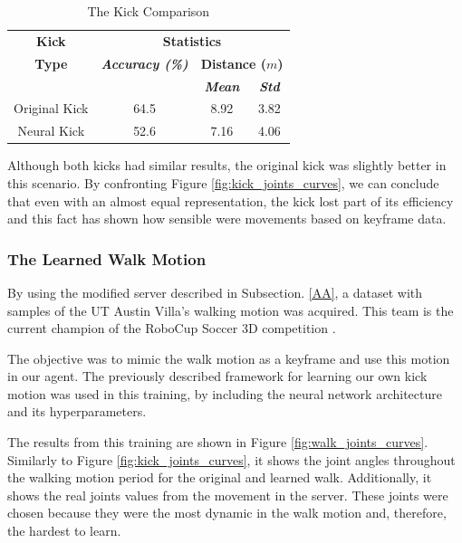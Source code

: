 \begin{table}[htbp]
	\caption{The Kick Comparison}
	\begin{center} 
		\begin{tabular}{|c|c|c|c|}
			\hline
			\textbf{Kick}&\multicolumn{3}{|c|}{\textbf{Statistics}} \\
			\cline{2-4} 
			\textbf{Type} & \textbf{\textit{Accuracy (\%)}}& \multicolumn{2}{|c|}{\textbf{Distance (\(m\))}} \\ 
			\cline {3-4}
			& & \textbf{\textit{Mean}}& \textbf{\textit{Std}} \\
			\hline
			Original Kick & 64.5 & 8.92 & 3.82  \\
			\hline
			Neural Kick & 52.6 & 7.16 & 4.06 \\
			\hline
		\end{tabular}
		\label{tab_kicks_statistics}
	\end{center}
\end{table}

Although both kicks had similar results, the original kick was slightly better in this scenario. By confronting Figure \ref{fig:kick_joints_curves}, we can conclude that even with an almost equal representation, the kick lost part of its efficiency and this fact has shown how sensible were movements based on keyframe data.

\subsubsection{The Learned Walk Motion}
By using the modified server described in Subsection. \ref{AA}, a dataset with samples of the UT Austin Villa's walking motion \cite{macalpine2013} was acquired. This team is the current champion of the RoboCup Soccer 3D competition \cite{macalpine2017}.

The objective was to mimic the walk motion as a keyframe and use this motion in our agent. The previously described framework for learning our own kick motion was used in this training, by including the neural network architecture and its hyperparameters.

The results from this training are shown in Figure \ref{fig:walk_joints_curves}. Similarly to Figure \ref{fig:kick_joints_curves}, it shows the joint angles throughout the walking motion period for the original and learned walk. Additionally, it shows the real joints values from the movement in the server. These joints were chosen because they were the most dynamic in the walk motion and, therefore, the hardest to learn.

